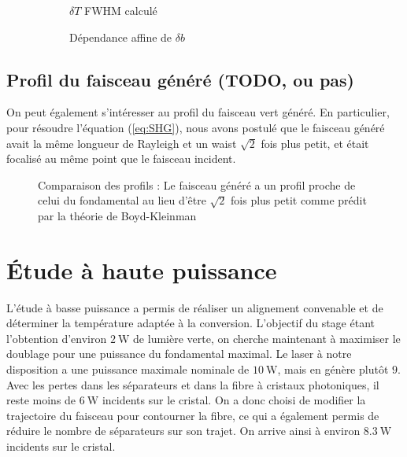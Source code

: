 \documentclass[11pt,a4paper] { article}
\newcommand{\zr}{z_\mathsc{R}}
\newcommand{\mathsc}[1]{\mathrm{\scriptscriptstyle {#1}}}
\begin{document}

\begin{figure}[htpb] 
\centering
\begin{subfigure}[b]{0.48\textwidth}
	\small
	
	\vspace{-0.42cm}
	\caption{$\delta T$ FWHM calculé}
	\label{fig:fwhm}
\end{subfigure}
\hspace{0.2cm}
\begin{subfigure}[b]{0.48\textwidth}
	\small
	
	\caption{Dépendance affine de $\delta b$}
	\label{fig:baff}
\end{subfigure}
\hspace{0.8cm}
\caption{}
\end{figure}


\subsection{Profil du faisceau généré (TODO, ou pas)} 

On peut également s'intéresser au profil du faisceau vert généré. En particulier, pour résoudre l'équation (\ref{eq:SHG}), nous avons postulé que le faisceau généré avait la même longueur de Rayleigh et un waist $\sqrt 2$ fois plus petit, et était focalisé au même point que le faisceau incident. 

\begin{figure}[h]  
	\centering
	
	\caption{Comparaison des profils : \small Le faisceau généré a un profil proche de celui du fondamental au lieu d'être $\sqrt2$ fois plus petit comme prédit par la théorie de Boyd-Kleinman} %
	\label{fig:vert}
\end{figure}


\section{Étude à haute puissance}

L'étude à basse puissance a permis de réaliser un alignement convenable et de déterminer la température adaptée à la conversion. L'objectif du stage étant l'obtention d'environ $\SI{2}{\watt}$ de lumière verte, on cherche maintenant à maximiser le doublage pour une puissance du fondamental maximal. Le laser à notre disposition a une puissance maximale nominale de $\SI{10}{\watt}$, mais en génère plutôt $9$. Avec les pertes dans les séparateurs et dans la fibre à cristaux photoniques, il reste moins de $\SI{6}{\watt}$ incidents sur le cristal. On a donc choisi de modifier la trajectoire du faisceau pour contourner la fibre, ce qui a également permis de réduire le nombre de séparateurs sur son trajet. On arrive ainsi à environ $\SI{8.3}{\watt}$ incidents sur le cristal. 
\end{document}
